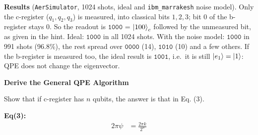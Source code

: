 \documentclass[a4paper, 10pt]{article}
\begin{document}
\begin{solution}
	\myspace

	\noindent \textbf{Results} (\texttt{AerSimulator}, 1024 shots, ideal and \texttt{ibm\_marrakesh} noise model). Only the c-register (\( q_1, q_2, q_3 \)) is measured, into classical bits \( 1, 2, 3 \); bit \( 0 \) of the b-register stays \( 0 \). So the readout is \( \texttt{1000} \) = \( \ket{100}_c \) followed by the unmeasured bit, as given in the hint.
	\noindent Ideal: \( \texttt{1000} \) in all 1024 shots. With the noise model: \( \texttt{1000} \) in 991 shots (96.8\%), the rest spread over \( \texttt{0000} \) (14), \( \texttt{1010} \) (10) and a few others. If the b-register is measured too, the ideal result is \( \texttt{1001} \), i.e.\ it is still \( \ket{e_1} = \ket{1} \): QPE does not change the eigenvector.
\end{solution}

\begin{problem}
\textbf{Derive the General QPE Algorithm}
\par Show that if c-register has \( n \) qubits, the answer is that in Eq. (3).

\noindent \textbf{Eq(3):}
\begin{align}
	2 \pi\psi & =  \frac{2\pi k}{2^n}
\end{align}
\end{problem}
\end{document}
